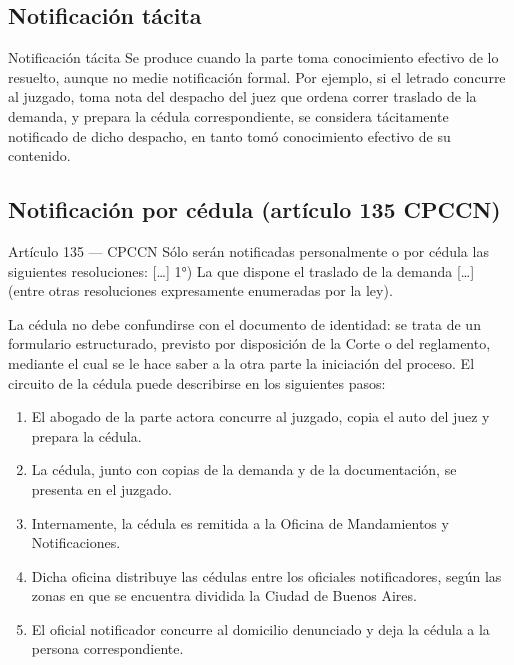 \documentclass[12pt,oneside]{book}
\begin{document}
\subsection{Notificación tácita}

\begin{definition}{Notificación tácita}
Se produce cuando la parte toma conocimiento efectivo de lo resuelto, aunque no medie notificación formal. Por ejemplo, si el letrado concurre al juzgado, toma nota del despacho del juez que ordena correr traslado de la demanda, y prepara la cédula correspondiente, se considera tácitamente notificado de dicho despacho, en tanto tomó conocimiento efectivo de su contenido.
\end{definition}

\subsection{Notificación por cédula (artículo 135 CPCCN)}

\begin{definition}{Artículo 135 --- CPCCN}
Sólo serán notificadas personalmente o por cédula las siguientes resoluciones: [\ldots] 1°) La que dispone el traslado de la demanda [\ldots] (entre otras resoluciones expresamente enumeradas por la ley).
\end{definition}

La cédula no debe confundirse con el documento de identidad: se trata de un formulario estructurado, previsto por disposición de la Corte o del reglamento, mediante el cual se le hace saber a la otra parte la iniciación del proceso. El circuito de la cédula puede describirse en los siguientes pasos:

\begin{enumerate}
    \item El abogado de la parte actora concurre al juzgado, copia el auto del juez y prepara la cédula.
    \item La cédula, junto con copias de la demanda y de la documentación, se presenta en el juzgado.
    \item Internamente, la cédula es remitida a la Oficina de Mandamientos y Notificaciones.
    \item Dicha oficina distribuye las cédulas entre los oficiales notificadores, según las zonas en que se encuentra dividida la Ciudad de Buenos Aires.
    \item El oficial notificador concurre al domicilio denunciado y deja la cédula a la persona correspondiente.
\end{enumerate}
\end{document}

